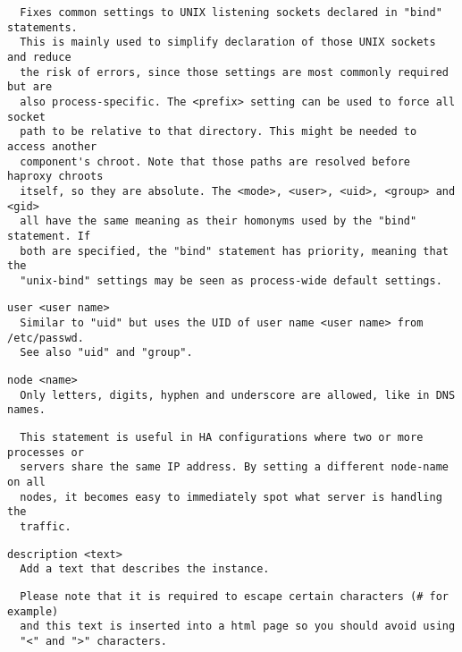 \begin{verbatim}
  Fixes common settings to UNIX listening sockets declared in "bind" statements.
  This is mainly used to simplify declaration of those UNIX sockets and reduce
  the risk of errors, since those settings are most commonly required but are
  also process-specific. The <prefix> setting can be used to force all socket
  path to be relative to that directory. This might be needed to access another
  component's chroot. Note that those paths are resolved before haproxy chroots
  itself, so they are absolute. The <mode>, <user>, <uid>, <group> and <gid>
  all have the same meaning as their homonyms used by the "bind" statement. If
  both are specified, the "bind" statement has priority, meaning that the
  "unix-bind" settings may be seen as process-wide default settings.
\end{verbatim}

\begin{verbatim}
user <user name>
  Similar to "uid" but uses the UID of user name <user name> from /etc/passwd.
  See also "uid" and "group".
\end{verbatim}

\begin{verbatim}
node <name>
  Only letters, digits, hyphen and underscore are allowed, like in DNS names.
\end{verbatim}

\begin{verbatim}
  This statement is useful in HA configurations where two or more processes or
  servers share the same IP address. By setting a different node-name on all
  nodes, it becomes easy to immediately spot what server is handling the
  traffic.
\end{verbatim}

\begin{verbatim}
description <text>
  Add a text that describes the instance.
\end{verbatim}

\begin{verbatim}
  Please note that it is required to escape certain characters (# for example)
  and this text is inserted into a html page so you should avoid using
  "<" and ">" characters.
\end{verbatim}

